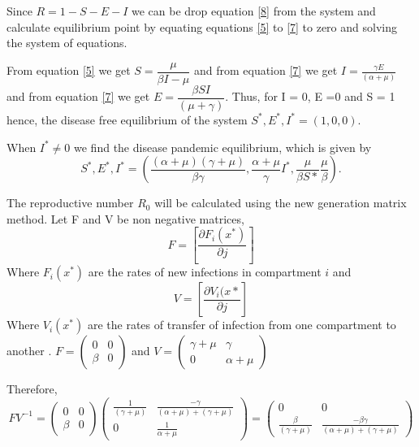  
Since $R = 1- S - E - I$
we can be drop equation \ref{8} from the system and  calculate equilibrium point by equating equations \ref{5} to \ref{7} to zero and solving the system of equations.

From equation \eqref{5} we get
$S = \dfrac{\mu}{\beta I - \mu}$ and from equation \ref{7} we get $I = \frac{\gamma E}{ (\alpha + \mu)}$ and from equation \ref{7} we get $ E = \dfrac{ \beta S I}{(\mu + \gamma)}.$ Thus, for I = 0, E =0 and S = 1 hence, the disease free equilibrium of the system $S^*, E^*, I^* = (1,0,0)$.

 When $I^* \neq 0$ we find the disease pandemic equilibrium, which is given by
\begin{equation*}
S^*, E^*, I^*  = \left(\frac{(\alpha + \mu)(\gamma + \mu)}{\beta \gamma} , \frac{\alpha + \mu }{ \gamma} I^*, \frac{\mu}{\beta S*} \frac{\mu}{\beta} \right).
\end{equation*}

The reproductive number $R_0$  will be calculated using the new generation matrix method. Let F and V be non negative matrices,
\begin{equation}
F = \left[ \frac{\partial F_i (x^*)}{\partial j}\right]
\end{equation}  Where  $F_i (x^*)$ are the rates of new infections in compartment $i$ and 
\begin{equation}
 V = \left[\dfrac{\partial V_i(x*}{\partial j} \right]
\end{equation}
  Where $V_i (x^*)$ are the rates of transfer of infection from one compartment to another \citep{van2002reproduction}.
  $F =\left(\begin{array}{cc} 
0&0 \\ \beta&0
\end{array} \right)$ and $V = \left(\begin{array}{cc} \gamma + \mu & \gamma \\ 0& \alpha + \mu \end{array} \right)$


Therefore,
\begin{equation}\label{4.2.29}
FV^{-1} = \left(\begin{array}{cc} 
0&0 \\ \beta&0
\end{array} \right) \left(\begin{array}{cc}
\frac{1}{(\gamma + \mu)}&  \frac{-\gamma}{(\alpha +\mu)+ (\gamma + \mu)}\\ 0& \frac{1}{\alpha + \mu}  

\end{array} \right) = \left(\begin{array}{cc} 0&0 \\
\frac{\beta}{(\gamma + \mu)} &\frac{- \beta\gamma}{(\alpha +\mu)+ (\gamma + \mu)} 
\end{array}\right)
\end{equation}

